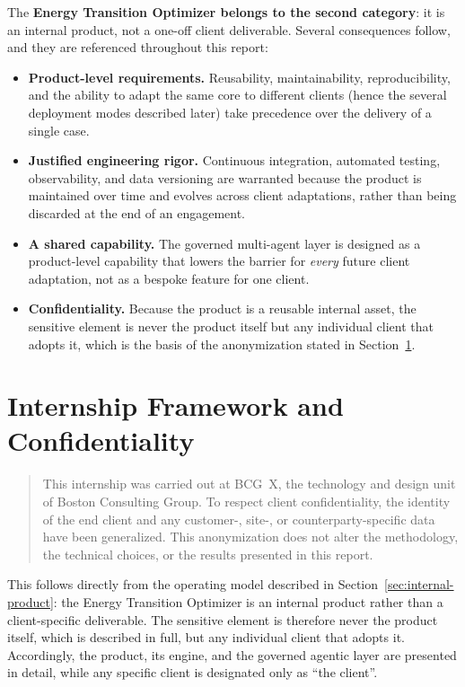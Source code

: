 The \textbf{Energy Transition Optimizer belongs to the second category}: it is an
internal product, not a one-off client deliverable. Several consequences follow,
and they are referenced throughout this report:

\begin{itemize}
  \item \textbf{Product-level requirements.} Reusability, maintainability,
    reproducibility, and the ability to adapt the same core to different clients
    (hence the several deployment modes described later) take precedence over the
    delivery of a single case.
  \item \textbf{Justified engineering rigor.} Continuous integration, automated
    testing, observability, and data versioning are warranted because the product
    is maintained over time and evolves across client adaptations, rather than
    being discarded at the end of an engagement.
  \item \textbf{A shared capability.} The governed multi-agent layer is designed
    as a product-level capability that lowers the barrier for \emph{every} future
    client adaptation, not as a bespoke feature for one client.
  \item \textbf{Confidentiality.} Because the product is a reusable internal
    asset, the sensitive element is never the product itself but any individual
    client that adopts it, which is the basis of the anonymization stated in
    Section~\ref{sec:confidentiality}.
\end{itemize}


\section{Internship Framework and Confidentiality}
\label{sec:confidentiality}

\begin{quote}
This internship was carried out at BCG~X, the technology and design unit of
Boston Consulting Group. To respect client confidentiality, the identity of the
end client and any customer-, site-, or counterparty-specific data have been
generalized. This anonymization does not alter the methodology, the technical
choices, or the results presented in this report.
\end{quote}

This follows directly from the operating model described in
Section~\ref{sec:internal-product}: the Energy Transition Optimizer is an
internal product rather than a client-specific deliverable. The sensitive element
is therefore never the product itself, which is described in full, but any
individual client that adopts it. Accordingly, the product, its engine, and the
governed agentic layer are presented in detail, while any specific client is
designated only as ``the client''.

